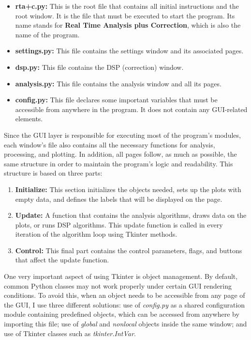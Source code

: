 \begin{itemize}
	\item \textbf{rta+c.py:} This is the root file that contains all initial instructions and the root window. It is the file that must be executed to start the program. Its name stands for \textbf{Real Time Analysis plus Correction}, which is also the name of the program.
	\item \textbf{settings.py:} This file contains the settings window and its associated pages.
	\item \textbf{dsp.py:} This file contains the DSP (correction) window.
	\item \textbf{analysis.py:} This file contains the analysis window and all its pages.
	\item \textbf{config.py:} This file declares some important variables that must be accessible from anywhere in the program. It does not contain any GUI-related elements.
\end{itemize}

Since the GUI layer is responsible for executing most of the program’s modules, each window’s file also contains all the necessary functions for analysis, processing, and plotting. In addition, all pages follow, as much as possible, the same structure in order to maintain the program’s logic and readability. This structure is based on three parts:

\begin{enumerate}
	\item \textbf{Initialize:} This section initializes the objects needed, sets up the plots with empty data, and defines the labels that will be displayed on the page.
	\item \textbf{Update:} A function that contains the analysis algorithms, draws data on the plots, or runs DSP algorithms. This update function is called in every iteration of the algorithm loop using Tkinter methods.
	\item \textbf{Control:} This final part contains the control parameters, flags, and buttons that affect the update function.
\end{enumerate}

One very important aspect of using Tkinter is object management. By default, common Python classes may not work properly under certain GUI rendering conditions. To avoid this, when an object needs to be accessible from any page of the GUI, I use three different solutions: use of \textit{config.py} as a shared configuration module containing predefined objects, which can be accessed from anywhere by importing this file; use of \textit{global} and \textit{nonlocal} objects inside the same window; and use of Tkinter classes such as \textit{tkinter.IntVar}.

